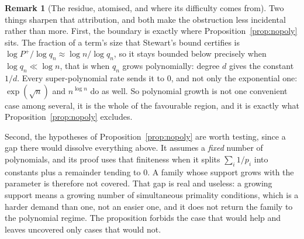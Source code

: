 \documentclass[11pt]{article}
\theoremstyle{definition}
\newtheorem{remark}[theorem]{Remark}
\begin{document}
\begin{remark}[The residue, atomised, and where its difficulty comes from]
Two things sharpen that attribution, and both make the obstruction less incidental rather than more.
First, the boundary is exactly where Proposition~\ref{prop:nopoly} sits. The fraction of a term's
size that Stewart's bound certifies is $\log P^+/\log q_n\approx\log n/\log q_n$, so it stays bounded
below precisely when $\log q_n\ll\log n$, that is when $q_n$ grows polynomially: degree $d$ gives the
constant $1/d$. Every super-polynomial rate sends it to $0$, and not only the exponential one:
$\exp(\sqrt n)$ and $n^{\log n}$ do as well. So polynomial growth is not one convenient case among
several, it is the whole of the favourable region, and it is exactly what
Proposition~\ref{prop:nopoly} excludes.

Second, the hypotheses of Proposition~\ref{prop:nopoly} are worth testing, since a gap there would
dissolve everything above. It assumes a \emph{fixed} number of polynomials, and its proof uses that
finiteness when it splits $\sum_i1/p_i$ into constants plus a remainder tending to $0$. A family
whose support grows with the parameter is therefore not covered. That gap is real and useless: a
growing support means a growing number of simultaneous primality conditions, which is a harder
demand than one, not an easier one, and it does not return the family to the polynomial regime. The
proposition forbids the case that would help and leaves uncovered only cases that would not.
\end{remark}
\end{document}
